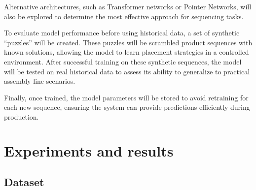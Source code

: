 \documentclass[12pt,a4paper]{report}
\begin{document}
Alternative architectures, such as Transformer networks or Pointer Networks, will also be explored to determine the most effective approach for sequencing tasks.  

To evaluate model performance before using historical data, a set of synthetic “puzzles” will be created. These puzzles will be scrambled product sequences with known solutions, allowing the model to learn placement strategies in a controlled environment. After successful training on these synthetic sequences, the model will be tested on real historical data to assess its ability to generalize to practical assembly line scenarios.

Finally, once trained, the model parameters will be stored to avoid retraining for each new sequence, ensuring the system can provide predictions efficiently during production.


\chapter{Experiments and results}
\section{Dataset}
\end{document}
